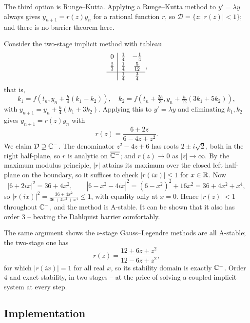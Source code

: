 \documentclass[a4paper]{scrartcl}
\providecommand{\abs}[1]{\left\lvert#1\right\rvert}
\renewcommand{\abs}[1]{\left\lvert#1\right\rvert}
\begin{document}
The third option is Runge--Kutta. Applying a Runge--Kutta method to $y' = \lambda y$ always gives $y_{n+1} = r(z)y_n$ for a rational function $r$, so $\mathcal{D} = \{z : \abs{r(z)} < 1\}$; and there is no barrier theorem here.

\begin{example}
  Consider the two-stage implicit method with tableau
  $$
  \begin{array}{c|cc}
    0 & \tfrac14 & -\tfrac14\\[2pt]
    \tfrac23 & \tfrac14 & \tfrac{5}{12}\\[2pt]\hline
      & \tfrac14 & \tfrac34
  \end{array},
  $$
  that is,
  $$
  k_1 = f\left(t_n, y_n + \tfrac{h}{4}(k_1 - k_2)\right), \quad k_2 = f\left(t_n + \tfrac{2h}{3}, y_n + \tfrac{h}{12}(3k_1 + 5k_2)\right),
  $$
  with $y_{n+1} = y_n + \tfrac{h}{4}(k_1 + 3k_2)$. Applying this to $y' = \lambda y$ and eliminating $k_1, k_2$ gives $y_{n+1} = r(z)y_n$ with
  $$
  r(z) = \frac{6 + 2z}{6 - 4z + z^2}.
  $$
  We claim $\mathcal{D} \supseteq \mathbb{C}^-$. The denominator $z^2 - 4z + 6$ has roots $2 \pm i\sqrt 2$, both in the right half-plane, so $r$ is analytic on $\overline{\mathbb{C}^-}$; and $r(z) \to 0$ as $\abs z \to \infty$. By the maximum modulus principle, $\abs{r}$ attains its maximum over the closed left half-plane on the boundary, so it suffices to check $\abs{r(ix)} \leq 1$ for $x \in \mathbb{R}$. Now
  $$
  \abs{6 + 2ix}^2 = 36 + 4x^2, \qquad \abs{6 - x^2 - 4ix}^2 = (6-x^2)^2 + 16x^2 = 36 + 4x^2 + x^4,
  $$
  so $\abs{r(ix)}^2 = \frac{36+4x^2}{36+4x^2+x^4} \leq 1$, with equality only at $x = 0$. Hence $\abs{r(z)} < 1$ throughout $\mathbb{C}^-$, and the method is A-stable. It can be shown that it also has order $3$ -- beating the Dahlquist barrier comfortably.
\end{example}

\begin{remark}
  The same argument shows the $\nu$-stage Gauss--Legendre methods are all A-stable; the two-stage one has
  $$
  r(z) = \frac{12 + 6z + z^2}{12 - 6z + z^2},
  $$
  for which $\abs{r(ix)} = 1$ for all real $x$, so its stability domain is exactly $\mathbb{C}^-$. Order $4$ and exact stability, in two stages -- at the price of solving a coupled implicit system at every step.
\end{remark}

\subsection{Implementation}
\end{document}
